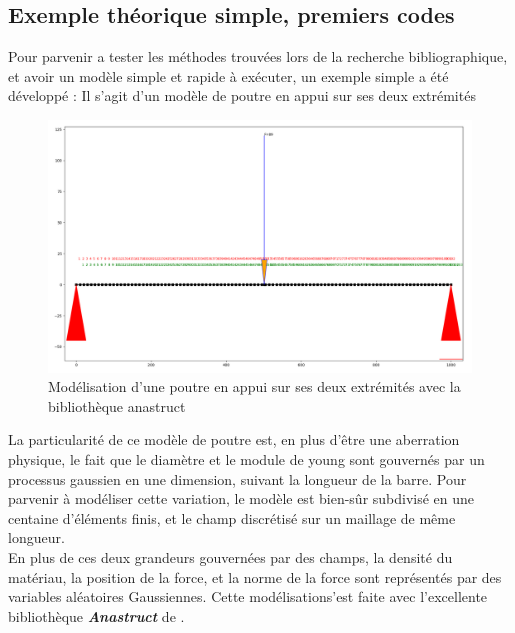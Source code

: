 \documentclass[a4paper,10pt]{article}
\begin{document}
\subsection{Exemple théorique simple, premiers codes}
Pour parvenir a tester les méthodes trouvées lors de la recherche bibliographique, et avoir un modèle simple et rapide à exécuter, un exemple simple a été développé : 
Il s'agit d'un modèle de poutre en appui sur ses deux extrémités
\begin{figure}[H]
   \centering   
   \includegraphics[width=\linewidth]{beam_structure.png}
      \caption{Modélisation d'une poutre en appui sur ses deux extrémités avec la bibliothèque anastruct}
         \label{fig:nonfloat}
\end{figure}

La particularité de ce modèle de poutre est, en plus d'être une aberration physique, le fait que le diamètre et le module de young sont gouvernés par un processus gaussien en une dimension, suivant la longueur de la barre. Pour parvenir à modéliser cette variation, le modèle est bien-sûr subdivisé en une centaine d'éléments finis, et le champ discrétisé sur un maillage de même longueur.\\
En plus de ces deux grandeurs gouvernées par des champs, la densité du matériau, la position de la force, et la norme de la force sont représentés par des variables aléatoires Gaussiennes. Cette modélisations'est faite avec l'excellente bibliothèque \textbf{\textit{Anastruct}} de \cite{Vink2020Feb}.
\end{document}
